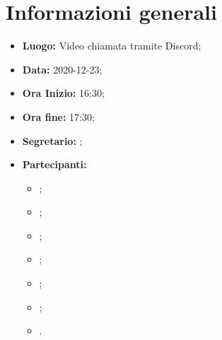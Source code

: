 \section{Informazioni generali}
	\begin{itemize}
		\item \textbf{Luogo:} Video chiamata tramite Discord;
		\item \textbf{Data:} 2020-12-23;
		\item \textbf{Ora Inizio:} 16:30;
		\item \textbf{Ora fine:} 17:30;
		\item \textbf{Segretario:} \NM;
		\item \textbf{Partecipanti:}
		\begin{itemize}
			\item \MB;
			\item \VAS;
			\item \FD;
			\item \NM;
			\item \SB;
			\item \GB;
			\item \MDI.
		\end{itemize}
		
	\end{itemize}